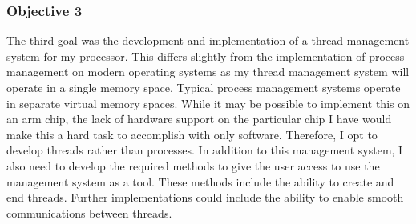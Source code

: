 \subsubsection{Objective 3}
\label{obj3}
The third goal was the development and implementation of a thread management system for my processor. This differs slightly from the implementation of process management \cite{process} on modern operating systems as my thread management system will operate in a single memory space. Typical process management systems operate in separate virtual memory spaces. While it may be possible to implement this on an arm chip, the lack of hardware support on the particular chip I have would make this a hard task to accomplish with only software. Therefore, I opt to develop threads rather than processes. In addition to this management system, I also need to develop the required methods to give the user access to use the management system as a tool. These methods include the ability to create and end threads. Further implementations could include the ability to enable smooth communications between threads. 